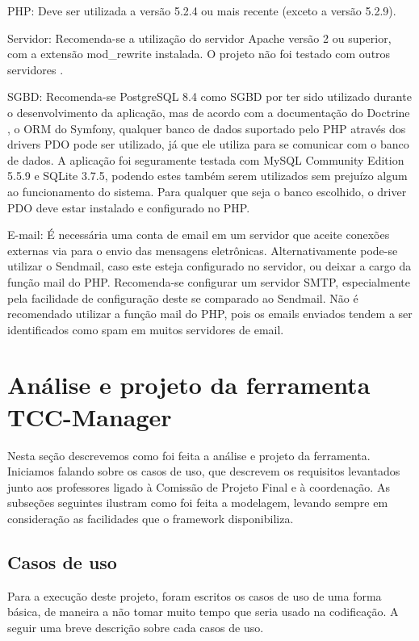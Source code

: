 \begin{list}
{}
\item PHP: Deve ser utilizada a versão 5.2.4 ou mais recente (exceto a versão 5.2.9).
\item Servidor: Recomenda-se a utilização do servidor Apache versão 2 ou superior, com a extensão
mod\_rewrite instalada. O projeto não foi testado com outros servidores .
\item SGBD: Recomenda-se PostgreSQL 8.4 como SGBD por ter sido utilizado durante o desenvolvimento da aplicação, mas
de acordo com a documentação do Doctrine \cite{doctrine}, o ORM do Symfony, qualquer banco de dados suportado pelo PHP através 
dos drivers PDO pode ser utilizado, já que ele utiliza  para se comunicar com o banco de dados.
A aplicação foi seguramente testada com MySQL Community Edition 5.5.9 e SQLite 3.7.5, podendo estes 
também serem utilizados sem prejuízo algum ao funcionamento do sistema. Para qualquer que seja o
banco escolhido, o driver PDO deve estar instalado e configurado no PHP.
\item E-mail: É necessária uma conta de email em um servidor que aceite conexões externas via  para
o envio das mensagens eletrônicas. Alternativamente pode-se utilizar o Sendmail, caso este esteja
configurado no servidor, ou deixar a cargo da função mail do PHP. Recomenda-se configurar um
servidor SMTP, especialmente pela facilidade de configura\-ção deste se comparado ao Sendmail. Não 
é recomendado utilizar a função mail do PHP, pois os emails enviados tendem a ser identificados
como spam em muitos servidores de email.
\end{list}

\section{Análise e projeto da ferramenta TCC-Manager}
Nesta seção descrevemos como foi feita a análise e projeto da ferramenta. Iniciamos falando sobre
os casos de uso, que descrevem os requisitos levantados junto aos professores ligado à Comissão de
Projeto Final e à coordenação. As subseções seguintes ilustram como foi feita a modelagem, levando
sempre em consideração as facilidades que o framework disponibiliza.

\subsection{Casos de uso}
Para a execução deste projeto, foram escritos os casos de uso de uma forma básica, de maneira a não
tomar muito tempo que seria usado na codificação. A seguir uma breve descrição sobre cada casos de uso.

